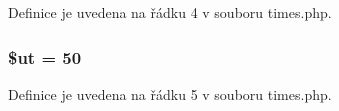 Definice je uvedena na řádku 4 v souboru times.\-php.

\hypertarget{times_8php_aadd3f841051043ee58e587e840e8dd0b}{
\subsubsection[{\$ut}]{\setlength{\rightskip}{0pt plus 5cm}\$ut = 50}}\label{times_8php_aadd3f841051043ee58e587e840e8dd0b}


Definice je uvedena na řádku 5 v souboru times.\-php.

